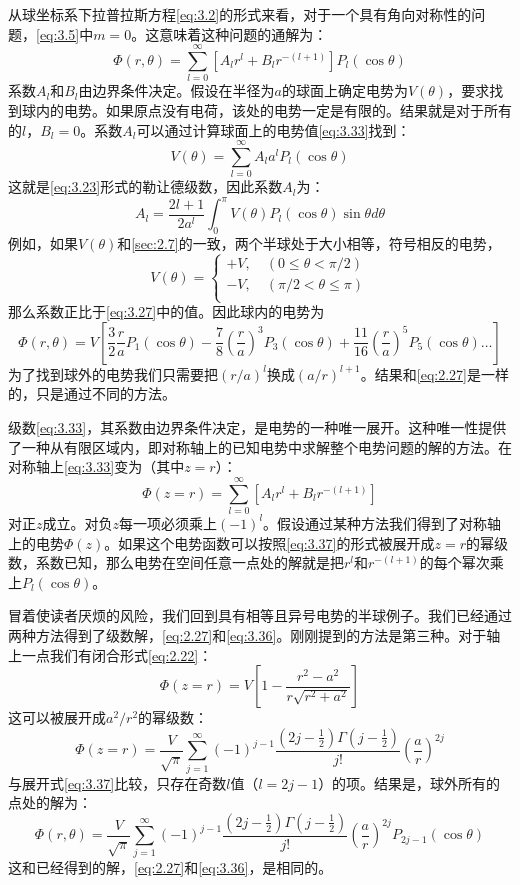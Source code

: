 \documentclass[12pt]{book}
\numberwithin{equation}{chapter}
\numberwithin{figure}{chapter}
\numberwithin{footnote}{page}
\begin{document}
从球坐标系下拉普拉斯方程\autoref{eq:3.2}的形式来看，对于一个具有角向对称性的问题，\autoref{eq:3.5}中$m=0$。这意味着这种问题的通解为：
\begin{equation}\label{eq:3.33}
    \Phi(r,\theta)=\sum_{l=0}^\infty [A_lr^l+B_lr^{-(l+1)}]P_l(\cos\theta)
\end{equation}
系数$A_l$和$B_l$由边界条件决定。假设在半径为$a$的球面上确定电势为$V(\theta)$，要求找到球内的电势。如果原点没有电荷，该处的电势一定是有限的。结果就是对于所有的$l$，$B_l=0$。系数$A_l$可以通过计算球面上的电势值\autoref{eq:3.33}找到：
\begin{equation}\label{eq:3.34}
    V(\theta)=\sum_{l=0}^\infty A_la^lP_l(\cos\theta)
\end{equation}
这就是\autoref{eq:3.23}形式的勒让德级数，因此系数$A_l$为：
\begin{equation}\label{eq:3.35}
    A_l=\frac{2l+1}{2a^l}\int_0^\pi V(\theta)P_l(\cos\theta)\sin\theta d\theta
\end{equation}
例如，如果$V(\theta)$和\autoref{sec:2.7}的一致，两个半球处于大小相等，符号相反的电势，
$$V(\theta)=\begin{cases}
    +V,\quad (0\leq\theta<\pi/2)\\
    -V,\quad (\pi/2<\theta\leq\pi)\\
\end{cases}$$
那么系数正比于\autoref{eq:3.27}中的值。因此球内的电势为
\begin{equation}\label{eq:3.36}
    \Phi(r,\theta)=V[\frac{3}{2}\frac{r}{a}P_1(\cos\theta)-\frac{7}{8}(\frac{r}{a})^3P_3(\cos\theta)+\frac{11}{16}(\frac{r}{a})^5P_5(\cos\theta)\dots]
\end{equation}
为了找到球外的电势我们只需要把$(r/a)^l$换成$(a/r)^{l+1}$。结果和\autoref{eq:2.27}是一样的，只是通过不同的方法。

级数\autoref{eq:3.33}，其系数由边界条件决定，是电势的一种唯一展开。这种唯一性提供了一种从有限区域内，即对称轴上的已知电势中求解整个电势问题的解的方法。在对称轴上\autoref{eq:3.33}变为（其中$z=r$）：
\begin{equation}\label{eq:3.37}
    \Phi(z=r)=\sum_{l=0}^\infty [A_lr^l+B_lr^{-(l+1)}]
\end{equation}
对正$z$成立。对负$z$每一项必须乘上$(-1)^l$。假设通过某种方法我们得到了对称轴上的电势$\Phi(z)$。如果这个电势函数可以按照\autoref{eq:3.37}的形式被展开成$z=r$的幂级数，系数已知，那么电势在空间任意一点处的解就是把$r^l$和$r^{-(l+1)}$的每个幂次乘上$P_l(\cos\theta)$。

冒着使读者厌烦的风险，我们回到具有相等且异号电势的半球例子。我们已经通过两种方法得到了级数解，\autoref{eq:2.27}和\autoref{eq:3.36}。刚刚提到的方法是第三种。对于轴上一点我们有闭合形式\autoref{eq:2.22}：
$$\Phi(z=r)=V[1-\frac{r^2-a^2}{r\sqrt{r^2+a^2}}]$$
这可以被展开成$a^2/r^2$的幂级数：
$$\Phi(z=r)=\frac{V}{\sqrt{\pi}}\sum_{j=1}^\infty (-1)^{j-1}\frac{(2j-\frac{1}{2})\Gamma(j-\frac{1}{2})}{j!}(\frac{a}{r})^{2j}$$
与展开式\autoref{eq:3.37}比较，只存在奇数$l$值（$l=2j-1$）的项。结果是，球外所有的点处的解为：
$$
    \Phi(r,\theta)=\frac{V}{\sqrt{\pi}}\sum_{j=1}^\infty (-1)^{j-1}\frac{(2j-\frac{1}{2})\Gamma(j-\frac{1}{2})}{j!}(\frac{a}{r})^{2j}P_{2j-1}(\cos\theta)
$$
这和已经得到的解，\autoref{eq:2.27}和\autoref{eq:3.36}，是相同的。
\end{document}

